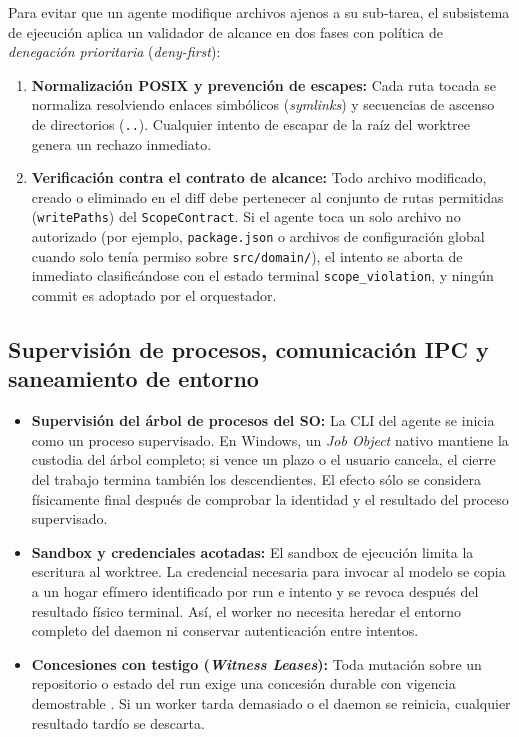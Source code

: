 Para evitar que un agente modifique archivos ajenos a su sub-tarea, el subsistema de ejecución aplica un validador de alcance en dos fases con política de \emph{denegación prioritaria} (\emph{deny-first}):

\begin{enumerate}
  \item \textbf{Normalización POSIX y prevención de escapes:} Cada ruta tocada se normaliza resolviendo enlaces simbólicos (\emph{symlinks}) y secuencias de ascenso de directorios (\texttt{..}). Cualquier intento de escapar de la raíz del worktree genera un rechazo inmediato.
  \item \textbf{Verificación contra el contrato de alcance:} Todo archivo modificado, creado o eliminado en el diff debe pertenecer al conjunto de rutas permitidas (\texttt{writePaths}) del \texttt{ScopeContract}. Si el agente toca un solo archivo no autorizado (por ejemplo, \texttt{package.json} o archivos de configuración global cuando solo tenía permiso sobre \texttt{src/domain/}), el intento se aborta de inmediato clasificándose con el estado terminal \texttt{scope\_violation}, y ningún commit es adoptado por el orquestador.
\end{enumerate}

\subsection{Supervisión de procesos, comunicación IPC y saneamiento de entorno}

\begin{itemize}
  \item \textbf{Supervisión del árbol de procesos del SO:} La CLI del agente se inicia como un proceso supervisado. En Windows, un \emph{Job Object} nativo mantiene la custodia del árbol completo; si vence un plazo o el usuario cancela, el cierre del trabajo termina también los descendientes. El efecto sólo se considera físicamente final después de comprobar la identidad y el resultado del proceso supervisado.
  \item \textbf{Sandbox y credenciales acotadas:} El sandbox de ejecución limita la escritura al worktree. La credencial necesaria para invocar al modelo se copia a un hogar efímero identificado por run e intento y se revoca después del resultado físico terminal. Así, el worker no necesita heredar el entorno completo del daemon ni conservar autenticación entre intentos.
  \item \textbf{Concesiones con testigo (\emph{Witness Leases}):} Toda mutación sobre un repositorio o estado del run exige una concesión durable con vigencia demostrable \cite{burrows2006chubby}. Si un worker tarda demasiado o el daemon se reinicia, cualquier resultado tardío se descarta.
\end{itemize}

